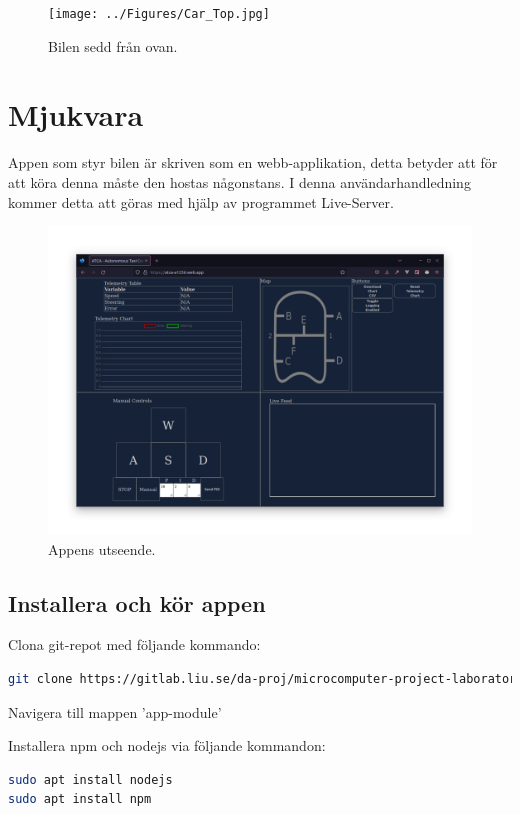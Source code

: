 \documentclass[10pt,oneside,swedish]{lips}
\begin{document}
\begin{figure}[htbp]
  \centering
  \texttt{[image: ../Figures/Car\_Top.jpg]}
  \caption{Bilen sedd från ovan.}
  \label{fig:car-top}
\end{figure}

\cleardoublepage
\section{Mjukvara}
Appen som styr bilen är skriven som en webb-applikation, detta betyder att för att köra denna måste den hostas någonstans.
I denna användarhandledning kommer detta att göras med hjälp av programmet Live-Server.

\begin{figure}[htbp]
  \centering
  \includegraphics[width=.7\textwidth]{../Figures/app-overview.png}
  \caption{Appens utseende.}
  \label{fig:app-overview}
\end{figure}

\subsection{Installera och kör appen} 

Clona git-repot med följande kommando:
\begin{lstlisting}[language=sh,frame=single, basicstyle=\footnotesize]
git clone https://gitlab.liu.se/da-proj/microcomputer-project-laboratory-d/2022/g13/projekt.git
\end{lstlisting}

\noindent
Navigera till mappen 'app-module'

\noindent
Installera npm och nodejs via följande kommandon:
\begin{lstlisting}[language=sh,frame=single]
sudo apt install nodejs
sudo apt install npm
\end{lstlisting}
\end{document}
